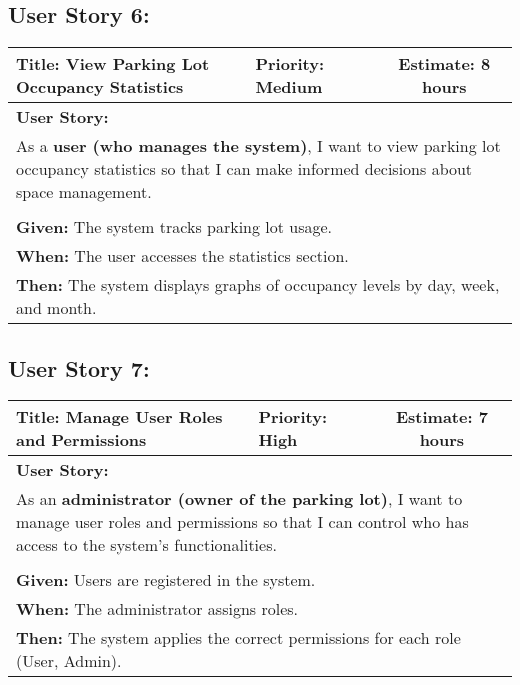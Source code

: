 \subsection{User Story 6:}
\begin{table}[h]
    \centering
    \begin{tabular}{|p{7cm}|p{4cm}|c|}
        \hline
        \rowcolor{lightblue}
        \textbf{Title: View Parking Lot Occupancy Statistics} & \textbf{Priority: Medium} & \textbf{Estimate: 8 hours} \\
        \hline
        \multicolumn{3}{|l|}{\textbf{User Story:}} \\
        \multicolumn{3}{|p{15cm}|}{As a \textbf{user (who manages the system)}, I want to view parking lot occupancy statistics so that I can make informed decisions about space management.} \\
        \hline
        \rowcolor{lightblue}
        \multicolumn{3}{|c|}{\textbf{Acceptance Criteria:}} \\
        \hline
        \multicolumn{3}{|l|}{\textbf{Given:} The system tracks parking lot usage.} \\
        \multicolumn{3}{|l|}{\textbf{When:} The user accesses the statistics section.} \\
        \multicolumn{3}{|l|}{\textbf{Then:} The system displays graphs of occupancy levels by day, week, and month.} \\
        \hline
    \end{tabular}
\end{table}

\newpage

\subsection{User Story 7:}
\begin{table}[h]
    \centering
    \begin{tabular}{|p{7cm}|p{4cm}|c|}
        \hline
        \rowcolor{lightblue}
        \textbf{Title: Manage User Roles and Permissions} & \textbf{Priority: High} & \textbf{Estimate: 7 hours} \\
        \hline
        \multicolumn{3}{|l|}{\textbf{User Story:}} \\
        \multicolumn{3}{|p{15cm}|}{As an \textbf{administrator (owner of the parking lot)}, I want to manage user roles and permissions so that I can control who has access to the system's functionalities.} \\
        \hline
        \rowcolor{lightblue}
        \multicolumn{3}{|c|}{\textbf{Acceptance Criteria:}} \\
        \hline
        \multicolumn{3}{|l|}{\textbf{Given:} Users are registered in the system.} \\
        \multicolumn{3}{|l|}{\textbf{When:} The administrator assigns roles.} \\
        \multicolumn{3}{|l|}{\textbf{Then:} The system applies the correct permissions for each role (User, Admin).} \\
        \hline
    \end{tabular}
\end{table}


